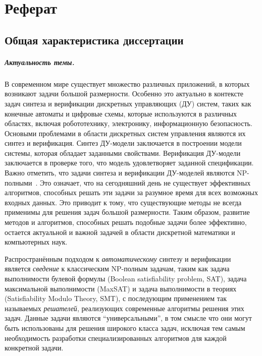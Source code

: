 \chapter*{Реферат}

\section*{Общая характеристика диссертации}

\paragraph*{Актуальность темы.}
%
В современном мире существует множество различных приложений, в которых возникают задачи большой размерности.
Особенно это актуально в контексте задач синтеза и верификации дискретных управляющих (ДУ) систем, таких как конечные автоматы и цифровые схемы, которые используются в различных областях, включая робототехнику, электронику, информационную безопасность.
Основыми проблемами в области дискретных систем управления являются их синтез и верификация.
Синтез ДУ-модели заключается в построении модели системы, которая обладает заданными свойствами.
Верификация ДУ-модели заключается в проверке того, что модель удовлетворяет заданной спецификации.
Важно отметить, что задачи синтеза и верификации ДУ-моделей являются NP-полными~\cite{clarke2018}.
Это означает, что на сегодняшний день не существует эффективных алгоритмов, способных решать эти задачи за разумное время для всех возможных входных данных.
Это приводит к тому, что существующие методы не всегда применимы для решения задач большой размерности.
Таким образом, развитие методов и алгоритмов, способных решать подобные задачи более эффективно, остается актуальной и важной задачей в области дискретной математики и компьютерных наук.

Распространённым подходом к \emph{автоматическому} синтезу и верификации является \emph{сведение} к классическим NP-полным задачам, таким как задача выполнимости булевой формулы (Boolean satisfiability problem, SAT), задача максимальной выполнимости (MaxSAT) и задача выполнимости в теориях (Satisfiability Modulo Theory, SMT), с последующим применением так называемых \emph{решателей}, реализующих современные алгоритмы решения этих задач.
Данные задачи являются \enquote{универсальными}, в том смысле что они могут быть использованы для решения широкого класса задач, исключая тем самым необходимость разработки специализированных алгоритмов для каждой конкретной задачи.

